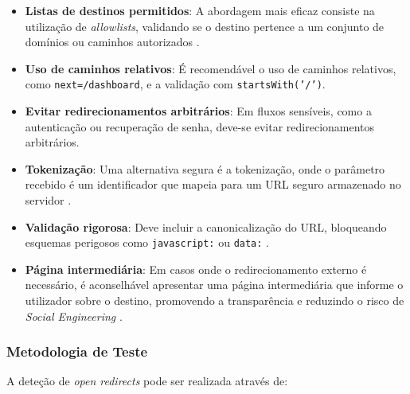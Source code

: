 \begin{itemize}
    \item \textbf{Listas de destinos permitidos}: A abordagem mais eficaz consiste na utilização de \textit{allowlists}, validando se o destino pertence a um conjunto de domínios ou caminhos autorizados \cite{ref36}.
    
    \item \textbf{Uso de caminhos relativos}: É recomendável o uso de caminhos relativos, como \texttt{next=/dashboard}, e a validação com \texttt{startsWith('/')}.
    
    \item \textbf{Evitar redirecionamentos arbitrários}: Em fluxos sensíveis, como a autenticação ou recuperação de senha, deve-se evitar redirecionamentos arbitrários.
    
    \item \textbf{Tokenização}: Uma alternativa segura é a tokenização, onde o parâmetro recebido é um identificador que mapeia para um URL seguro armazenado no servidor \cite{ref34}.
    
    \item \textbf{Validação rigorosa}: Deve incluir a canonicalização do URL, bloqueando esquemas perigosos como \texttt{javascript:} ou \texttt{data:} \cite{ref36}.
    
    \item \textbf{Página intermediária}: Em casos onde o redirecionamento externo é necessário, é aconselhável apresentar uma página intermediária que informe o utilizador sobre o destino, promovendo a transparência e reduzindo o risco de \textit{Social Engineering} \cite{ref35}.
\end{itemize}

\subsubsection{Metodologia de Teste}
\label{subsubsec:metodologia-teste-open-redirects}

A deteção de \textit{open redirects} pode ser realizada através de:

